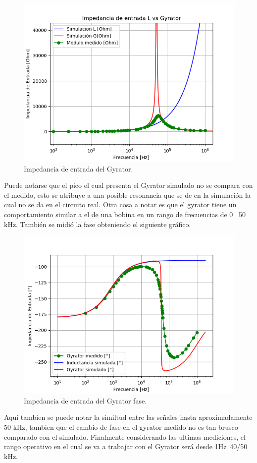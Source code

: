 \documentclass[a4paper]{article}
\begin{document}
\begin{figure}[H]	
	\centering
	\includegraphics[width=\textwidth]{ImagenesEj2/ZinG.png}
	\caption{Impedancia de entrada del Gyrator.}
	\label{fig:ZinG}
\end{figure}
Puede notarse que el pico el cual presenta el Gyrator simulado no se compara con el medido, esto se atribuye a una posible resonancia que se de en la simulación la cual no se da en el circuito real. Otra cosa a notar es que el gyrator tiene un comportamiento similar a el de una bobina en un rango de frecuencias de 0 ~50 kHz.
También se midió la fase obteniendo el siguiente gráfico.
\begin{figure}[H]	
	\centering
	\includegraphics[width=\textwidth]{ImagenesEj2/ZinGp.png}
	\caption{Impedancia de entrada del Gyrator fase.}
	\label{fig:ZinG}
\end{figure}
 Aquí tambien se puede notar la similtud entre las señales hasta aproximadamente 50 kHz, tambien que el cambio de fase en el gyrator medido no es tan brusco comparado  con el simulado.
Finalmente considerando las ultimas mediciones, el rango operativo en el cual se va  a trabajar con el Gyrator será desde 1Hz~40/50 kHz.
\end{document}
